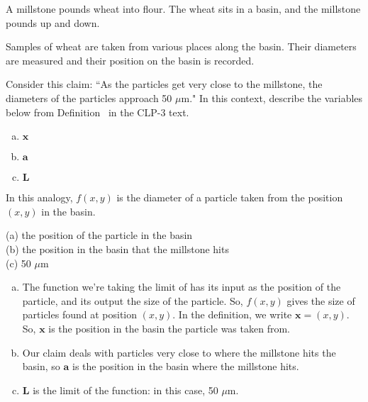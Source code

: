 \begin{question}
A millstone pounds wheat into flour. The wheat sits in a basin, and the millstone pounds up and down.

Samples of wheat are taken from various places along the basin. Their diameters are measured and their position on the basin is recorded.

Consider this claim: ``As the particles get very close to the millstone, the diameters of the particles approach 50 $\mu$m."
In this context, describe the variables below from Definition~ in the CLP-3 text.

\begin{enumerate}[(a)]
\item $\mathbf x$
\item $\mathbf a$
\item $\mathbf L$
\end{enumerate}
\end{question}
\begin{hint}
In this analogy, $f(x,y)$ is the diameter of a particle taken from the position $(x,y)$ in the basin.
\end{hint}
\begin{answer}
(a) the position of the particle in the basin \\
(b) the position in the basin that the millstone hits\\
(c) 50 $\mu$m
\end{answer}
\begin{solution}

\begin{enumerate}[(a)]
\item The function we're taking the limit of has its input as the position of the particle, and its output the size of the particle. So, $f(x,y)$ gives the size of particles found at position $(x,y)$. In the definition, we write $\mathbf x = (x,y)$. So, $\mathbf x$ is the position in the basin the particle was taken from.
\item Our claim deals with particles very close to where the millstone hits the basin, so $\mathbf a$ is the position in the basin where the millstone hits.
\item $\mathbf L$ is the limit of the function: in this case, 50 $\mu$m.
\end{enumerate}

\end{solution}

